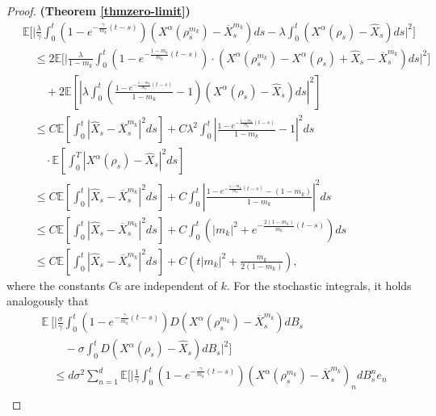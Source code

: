 \documentclass{ims9x6}
\newcommand{\nn}{\nonumber}
\newcommand{\EE}{\mathbb{E}}
\newcommand{\OX}{\overline{X}}
\begin{document}
\begin{proof}{\textbf{(Theorem \ref{thmzero-limit})}}
{\begin{align}
	&\EE \bigg[ \bigg|
	\frac{\lambda}{\gamma}
	\int_0^t(1-e^{-\frac{\gamma}{{m_k}}(t-s)}) (X^{\alpha}(\rho^{m_k}_s)-\OX_s^{m_k})ds- \lambda \int_0^t  (X^{\alpha}(\rho_s)-\widehat X_s)ds \bigg|^2\bigg]\nn\\
	 &\quad \leq  2 \EE \bigg[  \bigg|\frac{\lambda}{1-m_k}\int_0^t(1-e^{-\frac{1-m_k}{{m_k}}(t-s)}) \cdot (X^{\alpha}(\rho^{m_k}_s)- X^{\alpha}(\rho_s) + \widehat X_s-\OX_s^{m_k})ds \bigg|^2 \bigg]
	\nonumber \\
	&\qquad +2 \EE \left[  \left|{\lambda} 
	\int_0^t \left(\frac{1-e^{-\frac{1-m_k}{{m_k}}(t-s)}}{1-m_k} -1\right) (X^{\alpha}(\rho_s)- \widehat X_s)ds \right|^2  
	\right]
	\nonumber \\
	&\quad \leq 
	C  \EE \left[ \int_0^t  \left|   \widehat X_s-\OX_s^{m_k} \right|^2 ds \right] +C{\lambda^2}  \int_0^t \left|\frac{1-e^{-\frac{1-m_k}{{m_k}}(t-s)}}{1-m_k} -1\right|^2ds
	\nn\\
	\ &\qquad\cdot \EE \left[  \int_0^T \left|X^{\alpha}(\rho_s)- \widehat X_s\right|^2  ds 
	\right] 
	\nonumber \\
	&\quad \leq 
	C \EE \left[ \int_0^t  \left|   \widehat X_s-\OX_s^{m_k} \right|^2 ds \right]
	+ C 
	\int_0^t \left|\frac{1-e^{-\frac{1-m_k}{{m_k}}(t-s)}-(1-m_k)}{1-m_k} \right|^2ds  
	\nonumber \\
	&\quad \leq 
	C \EE \left[ \int_0^t  \left|   \widehat X_s-\OX_s^{m_k} \right|^2 ds \right]
	+ C 
	\int_0^t \left( \left|{m_k}\right|^2  +  e^{-\frac{2(1-m_k)}{{m_k}}(t-s)} \right) ds 
	\nonumber \\
	&\quad \leq 
	C \EE \left[ \int_0^t  \left|   \widehat X_s-\OX_s^{m_k} \right|^2 ds \right]
	+ C 
	\left( t \left|{m_k}\right|^2  + \frac{m_k}{2(1-m_k)}   \right)  , \label{est-drift}
	\end{align}}
	where the constants $C$s are independent of $k$.
	For the stochastic integrals, it holds analogously that
{\small 	\begin{align}
	&\EE \ \bigg[ \bigg|
	\frac{\sigma}{\gamma}
	\int_0^t(1-e^{-\frac{\gamma}{{m_k}}(t-s)}) D(X^{\alpha}(\rho^{m_k}_s)-\OX_s^{m_k})dB_s \nn\\
	&\qquad- \sigma \int_0^t  D(X^{\alpha}(\rho_s)-\widehat X_s)dB_s \bigg|^2\bigg]\nn\\
	&\quad \leq{d\sigma^2} \sum_{n=1}^d
	\EE \bigg[ \bigg|
	\frac{1}{\gamma}
	\int_0^t(1-e^{-\frac{\gamma}{{m_k}}(t-s)}) (X^{\alpha}(\rho^{m_k}_s)-\OX_s^{m_k})_ndB_s^ne_n\nn\\

\end{align}}
\end{proof}
\end{document}

